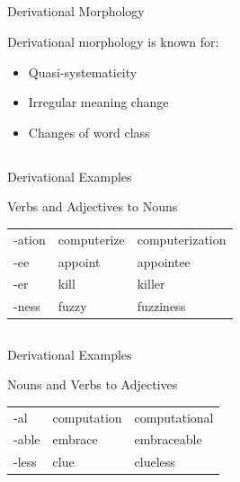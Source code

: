 \documentclass[9pt,xcolor=pdftex,dvipsnames,table]{beamer}
\begin{document}
\subsection{}
\begin{frame}{Derivational Morphology}

{\large Derivational morphology is known for: }
\vspace{1cm}

	\begin{itemize}
		\item Quasi-systematicity
		\item Irregular meaning change
		\item Changes of word class
	\end{itemize}
\end{frame}

\subsection{}
\begin{frame}{Derivational Examples}

{\large Verbs and Adjectives to Nouns }
\vspace{1cm}

\begin{center}
\begin{tabular}{l l l}
	-ation & computerize & computerization\\
	-ee & appoint & appointee\\
	-er & kill & killer\\
	-ness & fuzzy & fuzziness\\
\end{tabular}
\end{center}

\end{frame}

\subsection{}
\begin{frame}{Derivational Examples}

{\large Nouns and Verbs to Adjectives }
\vspace{1cm}

	\begin{center}
	\begin{tabular}{l l l}
		-al & computation & computational \\
		-able & embrace & embraceable \\
		-less & clue & clueless \\
	\end{tabular}
	\end{center}
\end{frame}
\end{document}
